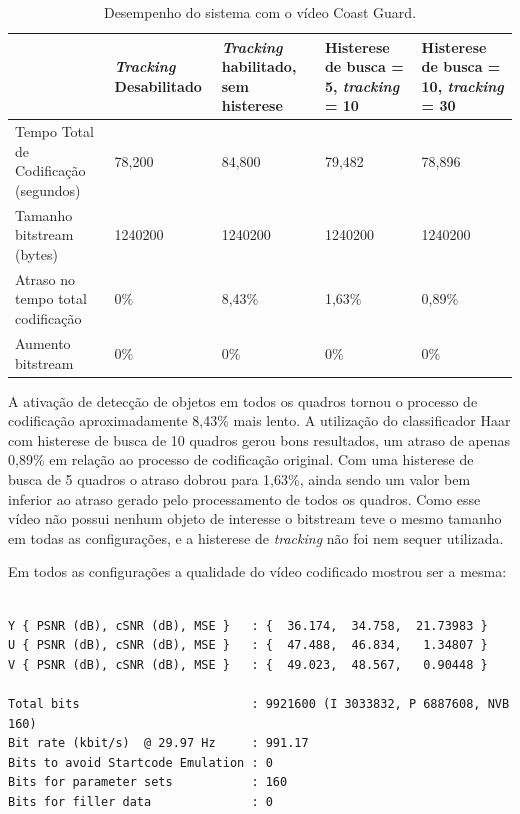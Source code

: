 \begin{table}[H]
\begin{center}
\begin{tabular}{|p{2.3cm}|p{2.3cm}|p{2.3cm}|p{2.3cm}|p{2.3cm}|}
\hline
\textbf{} & \textbf{\textit{Tracking} Desabilitado} & \textbf{\textit{Tracking} habilitado, sem histerese} & \textbf{Histerese de busca = 5, \textit{tracking} = 10} & \textbf{Histerese de busca = 10, \textit{tracking} = 30}  \\
\hline
Tempo Total de Codificação (segundos) & 78,200 & 84,800 & 79,482 & 78,896  \\
\hline
Tamanho bitstream (bytes) & 1240200 & 1240200 & 1240200 & 1240200  \\
\hline
Atraso no tempo total codificação & 0\% & 8,43\% & 1,63\% & 0,89\%  \\
\hline
Aumento bitstream  & 0\% & 0\% & 0\% & 0\%  \\
\hline
\end{tabular}
\caption{Desempenho do sistema com o vídeo Coast Guard.}
\label{tab:space_overhead}
\end{center}
\end{table}


A ativação de detecção de objetos em todos os quadros tornou o processo de codificação aproximadamente 8,43\% mais lento. A utilização do classificador Haar com histerese de busca de 10 quadros gerou bons resultados, um atraso de apenas 0,89\% em relação ao processo de codificação original. Com uma histerese de busca de 5 quadros o atraso dobrou para 1,63\%, ainda sendo um valor bem inferior ao atraso gerado pelo processamento de todos os quadros. Como esse vídeo não possui nenhum objeto de interesse o bitstream teve o mesmo tamanho em todas as configurações, e a histerese de \textit{tracking} não foi nem sequer utilizada.


Em todos as configurações a qualidade do vídeo codificado mostrou ser a mesma:

\begin{lstlisting}

Y { PSNR (dB), cSNR (dB), MSE }   : {  36.174,  34.758,  21.73983 }
U { PSNR (dB), cSNR (dB), MSE }   : {  47.488,  46.834,   1.34807 }
V { PSNR (dB), cSNR (dB), MSE }   : {  49.023,  48.567,   0.90448 }

Total bits                        : 9921600 (I 3033832, P 6887608, NVB 160) 
Bit rate (kbit/s)  @ 29.97 Hz     : 991.17
Bits to avoid Startcode Emulation : 0 
Bits for parameter sets           : 160 
Bits for filler data              : 0 

\end{lstlisting}



